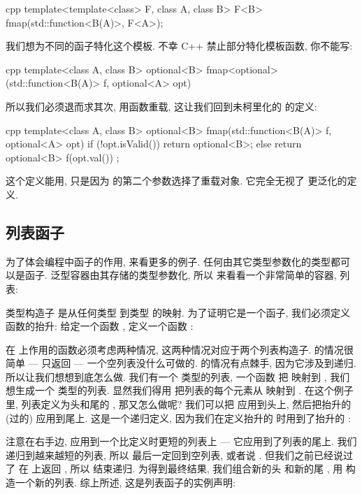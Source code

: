 \begin{snip}{cpp}
template<template<class> F, class A, class B>
F<B> fmap(std::function<B(A)>, F<A>);
\end{snip}
我们想为不同的函子特化这个模板. 不幸 C++ 禁止部分特化模板函数, 你不能写:

\begin{snip}{cpp}
template<class A, class B>
optional<B> fmap<optional>(std::function<B(A)> f, optional<A> opt)
\end{snip}
所以我们必须退而求其次, 用函数重载, 这让我们回到未柯里化的  的定义:

\begin{snip}{cpp}
template<class A, class B>
optional<B> fmap(std::function<B(A)> f, optional<A> opt) {
    if (!opt.isValid())
        return optional<B>{};
    else
        return optional<B>{ f(opt.val()) };
}
\end{snip}
这个定义能用, 只是因为  的第二个参数选择了重载对象. 它完全无视了  更泛化的定义.

\subsection{列表函子}

为了体会编程中函子的作用, 来看更多的例子. 任何由其它类型参数化的类型都可以是函子. 泛型容器由其存储的类型参数化, 所以
来看看一个非常简单的容器, 列表:

类型构造子  是从任何类型  到类型  的映射. 为了证明它是一个函子, 我们必须定义
函数的抬升: 给定一个函数 , 定义一个函数 :

在 上作用的函数必须考虑两种情况, 这两种情况对应于两个列表构造子.  的情况很简单 --- 只返回
 --- 一个空列表没什么可做的.  的情况有点棘手, 因为它涉及到递归. 所以让我们想想到底怎么做.
我们有一个  类型的列表, 一个函数  把  映射到 , 我们想生成一个  类型的列表.
显然我们得用  把列表的每个元素从  映射到 . 在这个例子里, 列表定义为头和尾的 ,
那又怎么做呢? 我们可以把  应用到头上, 然后把抬升的 (过的)  应用到尾上. 这是一个递归定义,
因为我们在定义抬升的  时用到了抬升的 :


注意在右手边,  应用到一个比定义时更短的列表上 --- 它应用到了列表的尾上. 我们递归到越来越短的列表, 所以
最后一定回到空列表, 或者说 . 但我们之前已经说过了  在  上返回 , 所以
结束递归. 为得到最终结果, 我们组合新的头  和新的尾 , 用  构造一个新的列表.
综上所述, 这是列表函子的实例声明:

